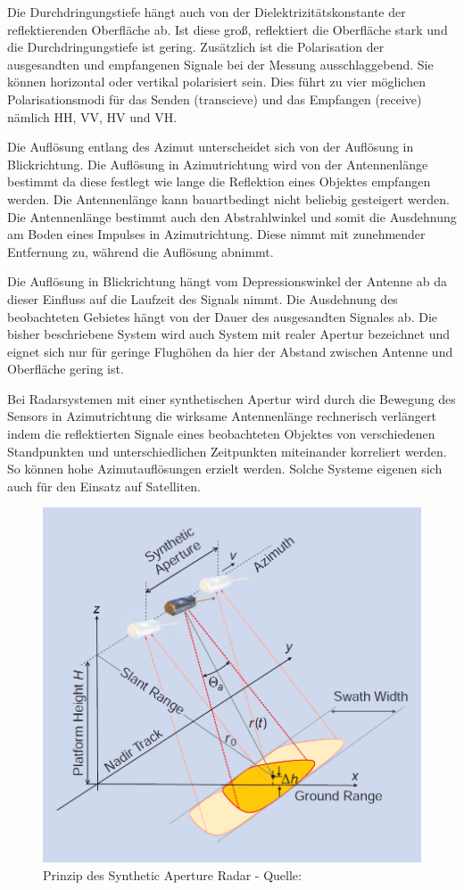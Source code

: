Die Durchdringungstiefe hängt auch von der Dielektrizitätskonstante der reflektierenden Oberfläche ab. Ist diese groß, reflektiert die Oberfläche stark und die 
Durchdringungstiefe ist gering. Zusätzlich ist die Polarisation der ausgesandten und empfangenen Signale bei der Messung ausschlaggebend. Sie können horizontal oder 
vertikal polarisiert sein. Dies führt zu vier möglichen Polarisationsmodi für das Senden (transcieve) und das Empfangen (receive) nämlich HH, VV, HV und VH.

Die Auflösung entlang des Azimut unterscheidet sich von der Auflösung in Blickrichtung. Die Auflösung in Azimutrichtung wird von der Antennenlänge 
bestimmt da diese festlegt wie lange die Reflektion eines Objektes empfangen werden. Die Antennenlänge kann bauartbedingt nicht beliebig gesteigert werden.
Die Antennenlänge bestimmt auch den Abstrahlwinkel und somit die Ausdehnung am Boden eines Impulses in Azimutrichtung. Diese nimmt mit zunehmender Entfernung
zu, während die Auflösung abnimmt.

Die Auflösung in Blickrichtung hängt vom Depressionswinkel der Antenne ab da dieser Einfluss auf die Laufzeit des Signals nimmt. Die Ausdehnung des beobachteten Gebietes hängt von der Dauer des ausgesandten Signales ab. Die bisher beschriebene System wird auch System mit realer Apertur bezeichnet und eignet sich nur für geringe
Flughöhen da hier der Abstand zwischen Antenne und Oberfläche gering ist. 

Bei Radarsystemen mit einer synthetischen Apertur wird durch die Bewegung des Sensors in Azimutrichtung die wirksame Antennenlänge rechnerisch verlängert indem 
die reflektierten Signale eines beobachteten Objektes von verschiedenen Standpunkten und unterschiedlichen Zeitpunkten miteinander korreliert werden. So können 
hohe Azimutauflösungen erzielt werden. Solche Systeme eigenen sich auch für den Einsatz auf Satelliten.

\begin{figure}[h]
    \centering
    \includegraphics[width=12cm]{Bilder/SAR_Prinzip.png}
    \caption{Prinzip des Synthetic Aperture Radar - Quelle: \cite{tutorial_on_sar}}
    \label{fig:sar_prinzip}
\end{figure}

